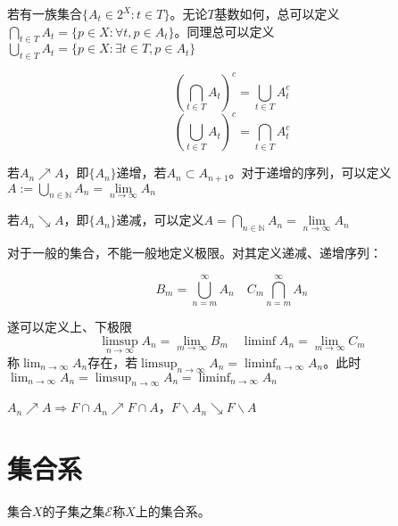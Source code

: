 \documentclass{ctexbook}
\begin{document}
若有一族集合$\{A_{t}\in 2^{X}:t\in T\}$。无论$T$基数如何，总可以定义$\bigcap_{t\in T}A_{t}=\{p\in X:\forall t,p\in A_{t}\}$。同理总可以定义$\bigcup_{t\in T}A_{t}=\{p\in X:\exists t\in T, p\in A_{t}\}$

\begin{Thm}[De Morgan]
  \[(\bigcap_{t\in T}A_{t})^{c}=\bigcup_{t\in T}A_{t}^{c}\]
  \[(\bigcup_{t\in T}A_{t})^{c}=\bigcap_{t\in T}A_{t}^{c}\]
  
\end{Thm}
若$A_{n}\nearrow A$，即$\{A_{n}\}$递增，若$A_{n}\subset A_{n+1}$。对于递增的序列，可以定义$A:=\bigcup_{n\in\mathbb{N}}A_{n}=\lim\limits_{n\to\infty}A_{n}$

若$A_{n}\searrow A$，即$\{A_{n}\}$递减，可以定义$A=\bigcap_{n\in\mathbb{N}}A_{n}=\lim\limits_{n\to\infty}A_{n}$

对于一般的集合，不能一般地定义极限。对其定义递减、递增序列：

\[B_{m}=\bigcup_{n=m}^{\infty}A_{n}\quad C_{m}\bigcap_{n=m}^{\infty}A_{n}\]

遂可以定义上、下极限
\[\limsup_{n\to\infty} A_{n}=\lim_{m\to\infty}B_{m}\quad \liminf A_{n}=\lim_{m\to\infty}C_{m}\]称$\lim_{n\to\infty}A_{n}$存在，若$\limsup_{n\to\infty}A_{n}=\liminf_{n\to\infty}A_{n}$。此时$\lim_{n\to\infty}A_{n}=\limsup_{n\to\infty}A_{n}=\liminf_{n\to\infty}A_{n}$

\begin{Prop}
  $A_{n}\nearrow A\Rightarrow F\cap A_{n}\nearrow F\cap A$，$F\backslash A_{n}\searrow F\backslash A$
\end{Prop}

\section{集合系}
\begin{Def}
集合$X$的子集之集$\mathcal{E}$称$X$上的集合系。
\end{Def}
\end{document}
